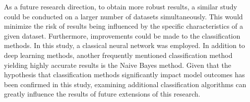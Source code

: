 As a future research direction, to obtain more robust results, a similar study could be conducted on a larger number of datasets simultaneously. This would minimize the risk of results being influenced by the specific characteristics of a given dataset. Furthermore, improvements could be made to the classification methods. In this study, a classical neural network was employed. In addition to deep learning methods, another frequently mentioned classification method yielding highly accurate results is the Naive Bayes method. Given that the hypothesis that classification methods significantly impact model outcomes has been confirmed in this study, examining additional classification algorithms can greatly influence the results of future extensions of this research.